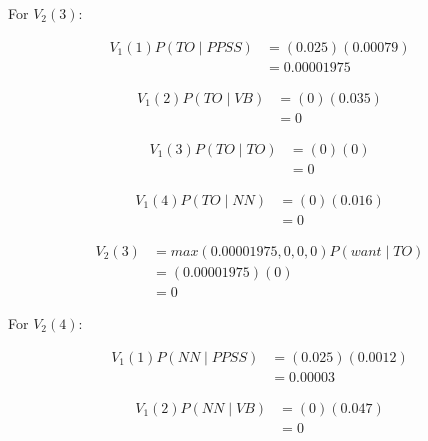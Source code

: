 \documentclass[10pt,a4paper]{article}
\begin{document}
For $V_2(3):$

\begin{equation}
\begin{split}
V_1(1)P(TO\mid PPSS) &= (0.025)(0.00079) \\
&= 0.00001975
\end{split}
\end{equation}

\begin{equation}
\begin{split}
V_1(2)P(TO\mid VB) &= (0)(0.035) \\
 &= 0
\end{split}
\end{equation}

\begin{equation}
\begin{split}
V_1(3)P(TO\mid TO) &= (0)(0) \\
&= 0
\end{split}
\end{equation}

\begin{equation}
\begin{split}
V_1(4)P(TO\mid NN) &= (0)(0.016) \\
 &= 0
\end{split}
\end{equation}

\begin{equation}
\begin{split}
V_2(3) &= max(0.00001975,0,0,0)P(want\mid TO) \\
 &=(0.00001975)(0) \\
 &=0
\end{split}
\end{equation}




For $V_2(4):$

\begin{equation}
\begin{split}
V_1(1)P(NN\mid PPSS) &= (0.025)(0.0012) \\
&= 0.00003
\end{split}
\end{equation}

\begin{equation}
\begin{split}
V_1(2)P(NN\mid VB) &= (0)(0.047) \\
 &= 0
\end{split}
\end{equation}
\end{document}
